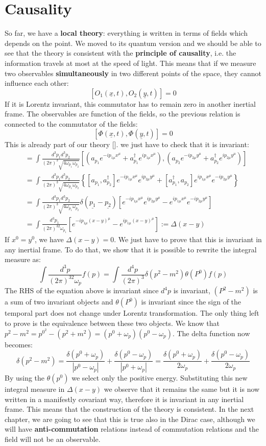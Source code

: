 \documentclass[../main.tex]{subfiles}
\begin{document}
\section{Causality}
So far, we have a \textbf{local theory}: everything is written in terms of fields which depends on the point. We moved to its quantum version and we should be able to see that the theory is consistent with the \textbf{principle of causality}, i.e. the information travels at most at the speed of light. This means that if we measure two observables \textbf{simultaneously} in two different points of the space, they cannot influence each other:
\[
[O_1(\underline{x},t),O_2(\underline{y},t)]=0
\]
If it is Lorentz invariant, this commutator has to remain zero in another inertial frame. The observables are function of the fields, so the previous relation is connected to the commutator of the fields:
\[
[\Phi(\underline{x},t),\Phi(\underline{y},t)]=0
\]
This is already part of our theory []. we just have to check that it is invariant:
\begin{align*}
[\Phi(x),\Phi(y)]&=\int\frac{d^3p_1d^3p_2}{(2\pi)^3\sqrt{4\omega_{p_1}\omega_{p_2}}}\left[(a_{p_1}e^{-ip_{1\mu}x^\mu}+a^\dagger_{p_1}e^{ip_{1\mu}x^\mu}),(a_{p_2}e^{-ip_{2\mu}y^\mu}+a^\dagger_{p_2}e^{ip_{2\mu}y^\mu})\right]\\
&=\int\frac{d^3p_1d^3p_2}{(2\pi)^3\sqrt{4\omega_{p_1}\omega_{p_2}}}\left\{[a_{p_1},a^\dagger_{p_2}]e^{-ip_{1\mu}x^\mu}e^{ip_{2\mu}y^\mu}+[a_{p_1}^\dagger,a_{p_2}]e^{ip_{1\mu}x^\mu}e^{-ip_{2\mu}y^\mu}\right\}\\
&=\int\frac{d^3p_1d^3p_2}{(2\pi)^3\sqrt{4\omega_{p_1}\omega_{p_2}}}\delta(\underline{p_1}-\underline{p_2})[e^{-ip_{1\mu}x^\mu}e^{ip_{2\mu}y^\mu}-e^{ip_{1\mu}x^\mu}e^{-ip_{2\mu}y^\mu}]\\
&=\int\frac{d^3p_1}{(2\pi)^32\omega_{p_1}}[e^{-ip_{1\mu}(x-y)^\mu}-e^{ip_{1\mu}(x-y)^\mu}]:=\Delta(x-y)
\end{align*}
If $x^0=y^0$, we have $\Delta(x-y)=0$. We just have to prove that this is invariant in any inertial frame. To do that, we show that it is possible to rewrite the integral measure as:
\[
\int\frac{d^3p}{(2\pi)^32\omega_p}f(p)=\int\frac{d^4p}{(2\pi)^3}\delta(p^2-m^2)\theta(P^0)f(p)
\]
The RHS of the equation above is invariant since $d^4p$ is invariant, $(P^2-m^2)$ is a sum of two invariant objects and $\theta(P^0)$ is invariant since the sign of the temporal part does not change under Lorentz transformation. The only thing left to prove is the equivalence between these two objects. We know that $p^2-m^2=p^0^2-(p^2+m^2)=(p^0+\omega_p)(p^0-\omega_p)$. The delta function now becomes:
\[
\delta(p^2-m^2)=\frac{\delta(p^0+\omega_p)}{|p^0-\omega_p|}+\frac{\delta(p^0-\omega_p)}{|p^0+\omega_p|}=\frac{\delta(p^0+\omega_p)}{2\omega_p}+\frac{\delta(p^0-\omega_p)}{2\omega_p}
\]
By using the $\theta(p^0)$ we select only the positive energy. Substituting this new integral measure in $\Delta(x-y)$ we observe that it remains the same but it is now written in a manifestly covariant way, therefore it is invariant in any inertial frame. This means that the construction of the theory is consistent. In the next chapter, we are going to see that this is true also in the Dirac case, although we will have \textbf{anti-commutation} relations instead of commutation relations and the field will not be an observable.
\end{document}
